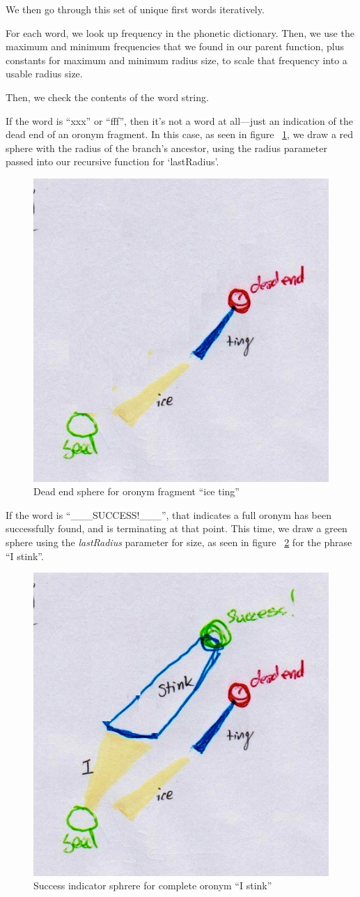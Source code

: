 We then go through this set of unique first words iteratively.

For each word, we look up frequency in the phonetic dictionary.  Then, we use the maximum and minimum frequencies that we found in our parent function, plus constants for maximum and minimum radius size, to scale that frequency into a usable radius size. 

Then, we check the contents of the word string. 

If the word is ``xxx'' or ``fff'', then it's not a word at all---just an indication of the dead end of an oronym fragment.  In this case, as seen in figure ~\ref{fig:oronymTree:deadEndIceTing}, we draw a red sphere with the radius of the branch's ancestor, using the radius parameter passed into our recursive function for `lastRadius'.  

\begin{figure}[ht]
\begin{center}
\includegraphics[width=.33\textwidth]{Fig3_3_5_DeadEndIceTing.jpg}
\captionfonts
\caption[Dead end for oronym fragment Ice Ting]{Dead end sphere for oronym fragment ``ice ting''}
\label{fig:oronymTree:deadEndIceTing}
\end{center}
\end{figure}

If the word is ``\_\_\_SUCCESS!\_\_\_'', that indicates a full oronym has been successfully found, and is terminating at that point. This time, we draw a green sphere using the \emph{lastRadius} parameter for size, as seen in figure ~\ref{fig:oronymTree:IStink} for the phrase ``I stink''.

\begin{figure}[ht]
\begin{center}
\includegraphics[width=.33\textwidth]{Fig3_3_6_IStink.jpg}
\captionfonts
\caption[Success indicator sphrere for complete oronym]{Success indicator sphrere for complete oronym ``I stink''}
\label{fig:oronymTree:IStink}
\end{center}
\end{figure}

